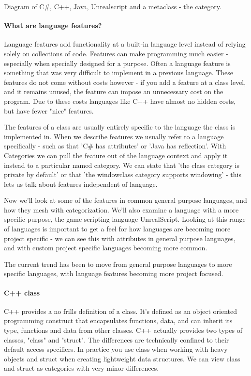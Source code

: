 Diagram of C\#, C++, Java, Unrealscript and a metaclass - the category.

\paragraph{What are language features?}
Language features add functionality at a built-in language level instead of
relying solely on collections of code.  Features can make
programming much easier - especially when specially designed for a purpose.  
Often a language feature is something that was very difficult 
to implement in a previous language.  These features do not come without costs however - if
you add a feature at a class level, and it remains unused, 
the feature can impose an unnecessary cost on the program.  Due
to these costs languages like C++ have almost no hidden costs, but
have fewer "nice" features.

The features of a class are usually entirely specific to the language
the class is implemented in.  When we describe features we usually refer
to a language specifically - such as that 'C\# has attributes' or 'Java has reflection'.  
With Categories we can pull the feature out of the language context and apply it instead to a particular
named category.  We can state that 'the class category is private by default' or that 'the windowclass category supports windowing' - this lets us talk about features independent of language.

Now we'll look at some of the features in common general purpose languages, and how they
mesh with categorization.  We'll also examine a language with a more specific purpose, the game scripting language UnrealScript.  Looking at this range of languages is important to get a feel for how
languages are becoming more project specific - we can see this with attributes in general purpose languages,
and with custom project specific languages becoming more common.

The current trend has been to move from general purpose languages to more specific languages, with
language features becoming more project focused.  

\paragraph{C++ class}
C++ provides a no frills definition of a class. It's defined as an object oriented programming construct
that encapsulates functions, data, and can inherit its type, functions and data from other classes.  C++ actually provides
two types of classes, "class" and "struct".  The differences are technically confined to their default access specifiers.
In practice you use class when working with heavy objects and struct when creating lightweight data structures.  We
can view class and struct as categories with very minor differences.

